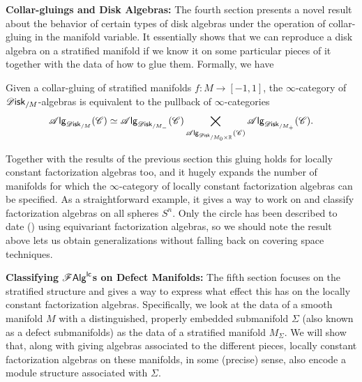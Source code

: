 \documentclass[../text]{subfiles}
\begin{document}
\textbf{ Collar-gluings and Disk Algebras:} The fourth section presents a novel result about the behavior of certain types of disk algebras under the operation of collar-gluing in the manifold variable. It essentially shows that we can reproduce a disk algebra on a stratified manifold if we know it on some particular pieces of it together with the data of how to glue them. Formally, we have
%
\begin{theorem*}[\ref{thm:gluing_alg_disk/M}]
    Given a collar-gluing of stratified manifolds $f: M \rightarrow [-1,1]$, the $\infty$-category of $\disk_{/M}$-algebras is equivalent to the pullback of $\infty$-categories
    \begin{equation}
        \alg{\disk_{/M}} (\catC) \simeq \alg{\disk_{/M_-}} (\catC) \bigtimes_{\alg{\disk_{/M_0 \times \mathbb{R}}} (\catC)} \alg{\disk_{/M_+}} (\catC).
    \end{equation}
\end{theorem*}
%
Together with the results of the previous section this gluing holds for locally constant factorization algebras too, and it hugely expands the number of manifolds for which the $\infty$-category of locally constant factorization algebras can be specified. As a straightforward example, it gives a way to work on and classify factorization algebras on all spheres $S^n$. Only the circle has been described to date (\cite{ginot2015}) using equivariant factorization algebras, so we should note the result above lets us obtain generalizations without falling back on covering space techniques. 

\textbf{ Classifying $\mathscr{F} \mathsf{Alg}^{\mathsf{lc}}$s on Defect Manifolds:} The fifth section focuses on the stratified structure and gives a way to express what effect this has on the locally constant factorization algebras. Specifically, we look at the data of a smooth manifold $M$ with a distinguished, properly embedded submanifold $\Sigma$ (also known as a defect submanifolds) as the data of a stratified manifold $M_\Sigma$. We will show that, along with giving algebras associated to the different pieces, locally constant factorization algebras on these manifolds, in some (precise) sense, also encode a module structure associated with $\Sigma$.
\end{document}
